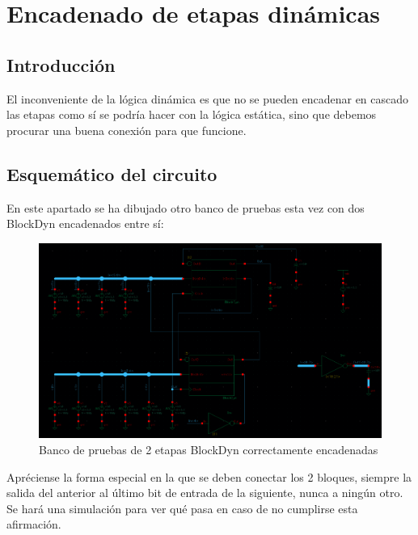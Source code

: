 
\chapter{Encadenado de etapas dinámicas}\label{ch:ch3label}
\section{Introducción}
El inconveniente de la lógica dinámica es que no se pueden encadenar en cascado las etapas como sí se podría hacer con la lógica estática, sino que debemos procurar una buena conexión para que funcione.
\section{Esquemático del circuito}
En este apartado se ha dibujado otro banco de pruebas esta vez con dos BlockDyn encadenados entre sí:
\begin{figure}[h]%
\begin {center}
\includegraphics[width=1.1\textwidth]{figures/BlockDynEncTBSchem.PNG}
\caption{Banco de pruebas de 2 etapas BlockDyn correctamente encadenadas}
\label{fig:SchemTBEnc}
\end {center}
\end{figure} \newline
Apréciense la forma especial en la que se deben conectar los 2 bloques, siempre la salida del anterior al último bit de entrada de la siguiente, nunca a ningún otro. Se hará una simulación para ver qué pasa en caso de no cumplirse esta afirmación. 
